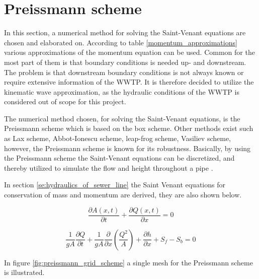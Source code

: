 ﻿\section{Preissmann scheme}\label{se:preissmann_scheme}
In this section, a numerical method for solving the Saint-Venant equations are chosen and elaborated on.
According to table \ref{momentum_approximations} various approximations of the momentum equation can be used. Common for the most part of them is that boundary conditions is needed up- and downstream. The problem is that downstream boundary conditions is not always known or require extensive information of the WWTP. It is therefore decided to utilize the kinematic wave approximation, as the hydraulic conditions of the WWTP is considered out of scope for this project.  

The numerical method chosen, for solving the Saint-Venant equations, is the Preissmann scheme which is based on the box scheme. Other methods exist such as Lax scheme, Abbot-Ionescu scheme, leap-frog scheme, Vasiliev scheme, however, the Preissmann scheme is known for its robustness. Basically, by using the Preissmann scheme the Saint-Venant equations can be discretized, and thereby utilized to simulate the flow and height throughout a pipe \cite{cunge1980practical}.

In section \ref{se:hydraulics_of_sewer_line} the Saint Venant equations for conservation of mass and momentum are derived, they are also shown below.

\begin{equation}\label{eq:saintbernard_mass_preiss}
\frac{\partial A(x,t)}{\partial t} + \frac{\partial Q(x,t)}{\partial x}=0
\end{equation}

\begin{equation}\label{eq:saintbernard_momentum_preiss}
\frac{1}{gA} \frac{\partial Q}{\partial t} +\frac{1}{gA}\frac{\partial}{\partial x} \left( \frac{Q^2}{A} \right) + \frac{\partial h}{\partial x} + S_f - S_b = 0
\end{equation}


In figure \ref{fig:preissmann_grid_scheme} a single mesh for the Preissmann scheme is illustrated.

